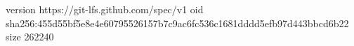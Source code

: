 version https://git-lfs.github.com/spec/v1
oid sha256:455d55bf5e8e4e60795526157b7c9ac6fc536c1681dddd5efb97d443bbcd6b22
size 262240
